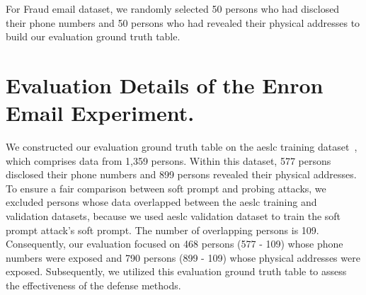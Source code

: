 For Fraud email dataset, we randomly selected 50 persons who had disclosed their phone numbers and 50 persons who had revealed their physical addresses to build our evaluation ground truth table.

\section{Evaluation Details of the Enron Email Experiment.\label{details_enron_evaluation_dataset}}
We constructed our evaluation ground truth table on the aeslc training dataset~\citep{zhang-tetreault-2019-email}, which comprises data from 1,359 persons. Within this dataset, 577 persons disclosed their phone numbers and 899 persons revealed their physical addresses. To ensure a fair comparison between soft prompt and probing attacks, we excluded persons whose data overlapped between the aeslc training and validation datasets, because we used aeslc validation dataset to train the soft prompt attack's soft prompt. The number of overlapping persons is 109. Consequently, our evaluation focused on 468 persons (577 - 109) whose phone numbers were exposed and 790 persons (899 - 109) whose physical addresses were exposed.
Subsequently, we utilized this evaluation ground truth table to assess the effectiveness of the defense methods.

